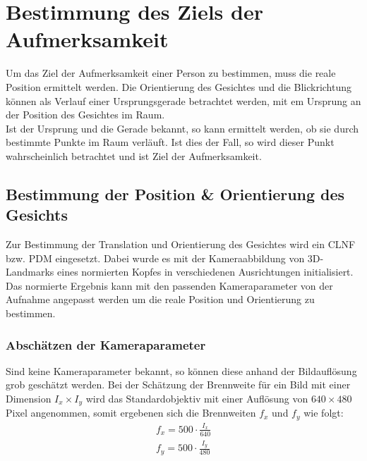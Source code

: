 \section{Bestimmung des Ziels der Aufmerksamkeit}
\label{calc_Position}
Um das Ziel der Aufmerksamkeit einer Person zu bestimmen, muss die reale Position ermittelt werden. Die Orientierung des Gesichtes und die Blickrichtung können als Verlauf einer Ursprungsgerade betrachtet werden, mit em Ursprung an der Position des Gesichtes im Raum.\\
Ist der Ursprung und die Gerade bekannt, so kann ermittelt werden, ob sie durch bestimmte Punkte im Raum verläuft. Ist dies der Fall, so wird dieser Punkt wahrscheinlich betrachtet und ist Ziel der Aufmerksamkeit.
\subsection{Bestimmung der Position \& Orientierung des Gesichts}
Zur Bestimmung der Translation und Orientierung des Gesichtes wird ein CLNF bzw. PDM eingesetzt. Dabei wurde es mit der Kameraabbildung von 3D-Landmarks eines normierten Kopfes in verschiedenen Ausrichtungen initialisiert. Das normierte Ergebnis kann mit den passenden Kameraparameter von der Aufnahme angepasst werden um die reale Position und Orientierung zu bestimmen.
\subsubsection{Abschätzen der Kameraparameter}
Sind keine Kameraparameter bekannt, so können diese anhand der Bildauflösung grob geschätzt werden. Bei der Schätzung der Brennweite für ein Bild mit einer Dimension $I_x\times I_y$ wird das Standardobjektiv mit einer Auflösung von $640 \times 480$ Pixel angenommen, somit ergebenen sich die Brennweiten $f_x$ und $f_y$ wie folgt:
\begin{align*}
f_x = 500\cdot \frac{I_x}{640}\\
f_y = 500\cdot \frac{I_y}{480}
\end{align*}
